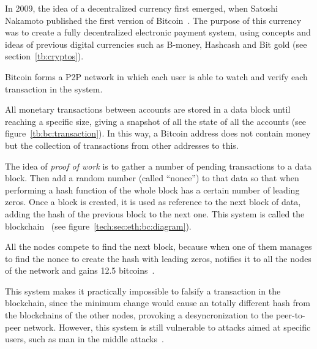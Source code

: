 
In 2009, the idea of a decentralized currency first emerged, when Satoshi
Nakamoto published the first version of Bitcoin~\cite{nakamoto2008bitcoin}. The
purpose of this currency was to create a fully decentralized electronic payment
system, using concepts and ideas of previous digital currencies such as B-money,
Hashcash and Bit gold (see section~\ref{tb:cryptos}).

Bitcoin forms a P2P network in which each user is able to watch and verify each
transaction in the system.


All monetary transactions between accounts are stored in a data block until
reaching a specific size, giving a snapshot of all the state of all the accounts
(see figure~\ref{tb:bc:transaction}). In this way, a Bitcoin address does not
contain money but the collection of transactions from other addresses to this.

The idea of \emph{proof of work} is to gather a number of pending transactions
to a data block. Then add a random number (called ``nonce'') to that data so
that when performing a hash function of the whole block has a certain number of
leading zeros. Once a block is created, it is used as reference to the next
block of data, adding the hash of the previous block to the next one. This
system is called the blockchain~\cite{antonopoulos2014mastering} (see
figure~\ref{tech:sec:eth:bc:diagram}).


All the nodes compete to find the next block, because when one of them manages
to find the nonce to create the hash with leading zeros, notifies it to all the
nodes of the network and gains 12.5 bitcoins~\cite{barber2012bitter}.

This system makes it practically impossible to falsify a transaction in the
blockchain, since the minimum change would cause an totally different hash from
the blockchains of the other nodes, provoking a desyncronization to the
peer-to-peer network. However, this system is still vulnerable to attacks aimed
at specific users, such as man in the middle attacks~\cite{moore2013beware}.

